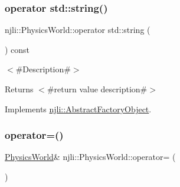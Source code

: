 \subsubsection{\texorpdfstring{operator std\+::string()}{operator std::string()}}
{\footnotesize\ttfamily njli\+::\+Physics\+World\+::operator std\+::string (\begin{DoxyParamCaption}{ }\end{DoxyParamCaption}) const\hspace{0.3cm}{\ttfamily [virtual]}}

$<$\#\+Description\#$>$

\begin{DoxyReturn}{Returns}
$<$\#return value description\#$>$ 
\end{DoxyReturn}


Implements \mbox{\hyperlink{classnjli_1_1_abstract_factory_object_a838f4fa7e65cace6098aab5222892942}{njli\+::\+Abstract\+Factory\+Object}}.

\mbox{\label{classnjli_1_1_physics_world_ac324be9f6e37e0057c461202203863d2}} 
\subsubsection{\texorpdfstring{operator=()}{operator=()}}
{\footnotesize\ttfamily \mbox{\hyperlink{classnjli_1_1_physics_world}{Physics\+World}}\& njli\+::\+Physics\+World\+::operator= (\begin{DoxyParamCaption}\item[{const \mbox{\hyperlink{classnjli_1_1_physics_world}{Physics\+World}} \&}]{ }\end{DoxyParamCaption})\hspace{0.3cm}{\ttfamily [protected]}}

\mbox{\label{classnjli_1_1_physics_world_a211942b503f8a7d2932504a2c7e5ac66}} 
